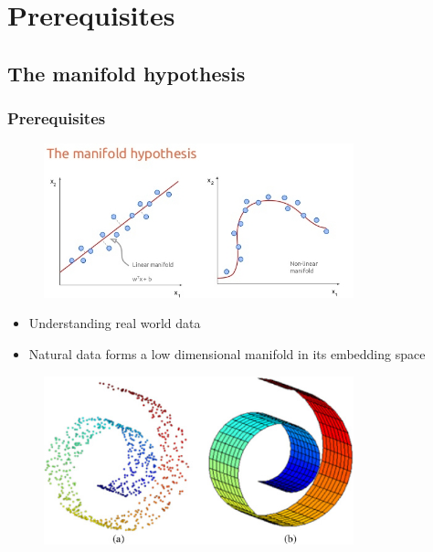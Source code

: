 \documentclass{Bredelebeamer}
\begin{document}
\section{Prerequisites}
\subsection{The manifold hypothesis}


\begin{frame}
\frametitle{Prerequisites}
\begin{figure}[h!]
	\centering
	\includegraphics[width=0.8\textwidth]{manifold_hypothesis.jpg}
\end{figure}
\begin{itemize}[<+(1)->]
	\item Understanding real world data
	\item Natural data forms a low dimensional manifold in its embedding space
\end{itemize}

\end{frame}
\begin{frame}
\begin{figure}[h!]
	\centering
	\includegraphics[width=0.8\textwidth]{swiss_roll.jpg}
\end{figure}

\end{frame}
\end{document}
